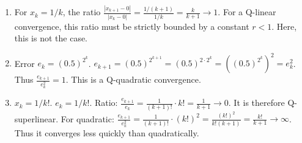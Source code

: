 \begin{correction}
\begin{enumerate}
    \item For $x_k = 1/k$, the ratio $\frac{|x_{k+1}-0|}{|x_k-0|} = \frac{1/(k+1)}{1/k} = \frac{k}{k+1} \to 1$. For a Q-linear convergence, this ratio must be strictly bounded by a constant $r < 1$. Here, this is not the case.
    \item Error $e_k = (0.5)^{2^k}$.
    $e_{k+1} = (0.5)^{2^{k+1}} = (0.5)^{2 \cdot 2^k} = ((0.5)^{2^k})^2 = e_k^2$.
    Thus $\frac{e_{k+1}}{e_k^2} = 1$. This is a Q-quadratic convergence.
    \item $x_k = 1/k!$. $e_k = 1/k!$.
    Ratio: $\frac{e_{k+1}}{e_k} = \frac{1}{(k+1)!} \cdot k! = \frac{1}{k+1} \to 0$. It is therefore Q-superlinear.
    For quadratic: $\frac{e_{k+1}}{e_k^2} = \frac{1}{(k+1)!} \cdot (k!)^2 = \frac{(k!)^2}{k!(k+1)} = \frac{k!}{k+1} \to \infty$.
    Thus it converges less quickly than quadratically.
\end{enumerate}
\end{correction}
\bigskip
